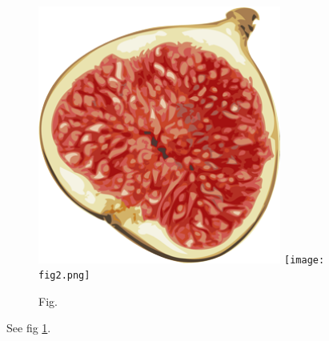 \documentclass{article}
\begin{document}
  \begin{figure}[h]
    \includegraphics[width=8cm]{fig.png}
    \texttt{[image: fig2.png]}
    \caption{Fig.}
    \label{fig:fig}
  \end{figure}
  See fig \ref{fig:fig}.
\end{document}
